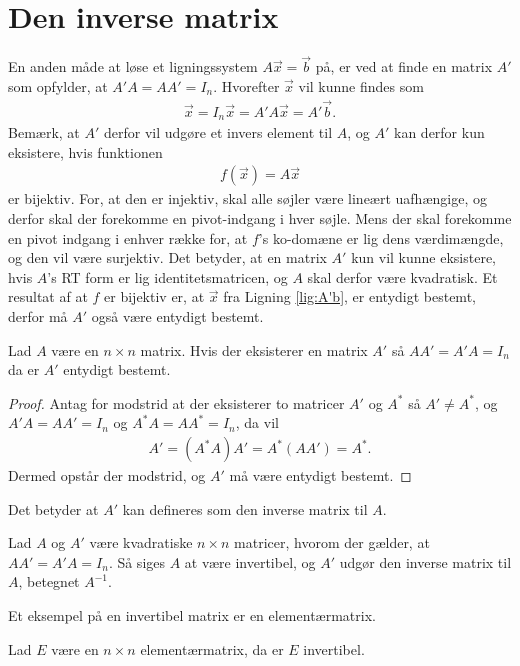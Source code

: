 \section{Den inverse matrix}
En anden måde at løse et ligningssystem $A\vec{x} = \vec{b}$ på, er ved at finde en matrix $A'$ som opfylder, at $A'A =A A' = I_n$.
Hvorefter $\vec{x}$ vil kunne findes som
\begin{align}
\vec{x}= I_n\vec{x} = A'A\vec{x} = A'\vec{b}.
\label{lig:A'b}
\end{align}
Bemærk, at $A'$ derfor vil udgøre et invers element til $A$, og $A'$ kan derfor kun eksistere, hvis funktionen
\begin{align*}
f(\vec{x}) = A \vec{x} 
\label{lig:funktion}
\end{align*}
er bijektiv.
For, at den er injektiv, skal alle søjler være lineært uafhængige, og derfor skal der forekomme en pivot-indgang i hver søjle.
Mens der skal forekomme en pivot indgang i enhver række for, at $f$'s ko-domæne er lig dens værdimængde, og den vil være surjektiv. 
Det betyder, at en matrix $A'$ kun vil kunne eksistere, hvis $A$'s RT form er lig identitetsmatricen, og $A$ skal derfor være kvadratisk.
Et resultat af at $f$ er bijektiv er, at $\vec{x}$ fra Ligning \eqref{lig:A'b}, er entydigt bestemt, derfor må $A'$ også være entydigt bestemt.
\begin{stn}
Lad $A$ være en $n \times n $ matrix. Hvis der eksisterer en matrix $A'$ så $AA'= A'A = I_n$ da er $A'$ entydigt bestemt.
\label{stn:entydiginvers}
\end{stn}
\begin{proof}
Antag for modstrid at der eksisterer to matricer $A'$ og $A^*$ så $A' \neq A^*$, og $A'A= AA' = I_n$ og $A^*A = AA^* = I_n$, da vil
\begin{align*}
A' = (A^*A)A' = A^*(AA') = A^*.
\end{align*}
Dermed opstår der modstrid, og $A'$ må være entydigt bestemt.
\end{proof}
Det betyder at $A'$ kan defineres som den inverse matrix til $A$.
\begin{defn}
Lad $A$ og $A'$ være kvadratiske $n \times n$ matricer, hvorom der gælder, at $AA'=A'A=I_n$. 
Så siges $A$ at være invertibel, og $A'$ udgør den inverse matrix til $A$, betegnet $A^{-1}$. 
\label{def(inversmatrix)}
\end{defn}
Et eksempel på en invertibel matrix er en elementærmatrix.
\begin{lma}
Lad $E$ være en $n \times n$ elementærmatrix, da er $E$ invertibel.
\label{lma:Einvertibel}
\end{lma}
